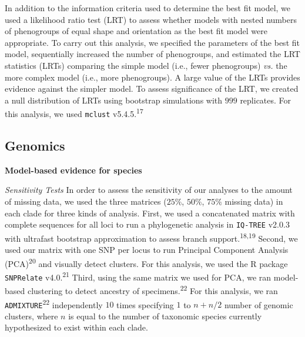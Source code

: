 \documentclass[
  11pt,
]{article}
\begin{document}
In addition to the information criteria used to determine the best fit model, we used a likelihood ratio test (LRT) to assess whether models with nested numbers of phenogroups of equal shape and orientation as the best fit model were appropriate. To carry out this analysis, we specified the parameters of the best fit model, sequentially increased the number of phenogroups, and estimated the LRT statistics (LRTs) comparing the simple model (i.e., fewer phenogroups) \emph{vs.} the more complex model (i.e., more phenogroups). A large value of the LRTs provides evidence against the simpler model. To assess significance of the LRT, we created a null distribution of LRTs using bootstrap simulations with \(999\) replicates. For this analysis, we used \texttt{mclust} v5.4.5.\textsuperscript{17}

\hypertarget{genomics}{%
\subsection{Genomics}\label{genomics}}

\textbf{Model-based evidence for species}

\emph{Sensitivity Tests} In order to assess the sensitivity of our analyses to the amount of missing data, we used the three matrices (\(25\%\), \(50\%\), \(75\%\) missing data) in each clade for three kinds of analysis. First, we used a concatenated matrix with complete sequences for all loci to run a phylogenetic analysis in \texttt{IQ-TREE} v2.0.3 with ultrafast bootstrap approximation to assess branch support.\textsuperscript{18,19} Second, we used our matrix with one SNP per locus to run Principal Component Analysis (PCA)\textsuperscript{20} and visually detect clusters. For this analysis, we used the R package \texttt{SNPRelate} v4.0.\textsuperscript{21} Third, using the same matrix we used for PCA, we ran model-based clustering to detect ancestry of specimens.\textsuperscript{22} For this analysis, we ran \texttt{ADMIXTURE}\textsuperscript{22} independently \(10\) times specifying \(1\) to \(n + n/2\) number of genomic clusters, where \(n\) is equal to the number of taxonomic species currently hypothesized to exist within each clade.
\end{document}
